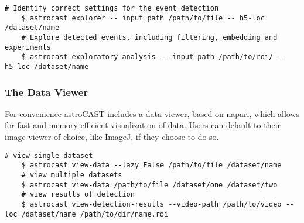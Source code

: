 \begin{lstlisting}[style=bashStyle]
    # Identify correct settings for the event detection
    $ astrocast explorer -- input path /path/to/file -- h5-loc /dataset/name
    # Explore detected events, including filtering, embedding and experiments
    $ astrocast exploratory-analysis -- input path /path/to/roi/ -- h5-loc /dataset/name
\end{lstlisting}

\subsubsection{The Data Viewer}

For convenience astroCAST includes a data viewer, based on napari\citep{sofroniew_nicholas_napari_2022}, which allows for fast and memory efficient visualization of data. Users can default to their image viewer of choice, like ImageJ, if they choose to do so.

\begin{lstlisting}[style=bashStyle]
    # view single dataset
    $ astrocast view-data --lazy False /path/to/file /dataset/name
    # view multiple datasets
    $ astrocast view-data /path/to/file /dataset/one /dataset/two
    # view results of detection
    $ astrocast view-detection-results --video-path /path/to/video --loc /dataset/name /path/to/dir/name.roi
\end{lstlisting}

